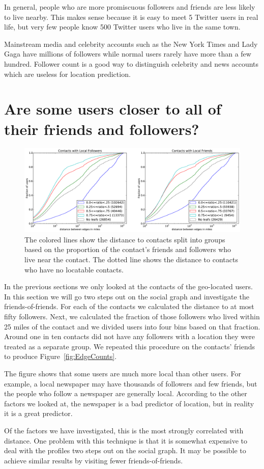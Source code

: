 In general, people who are more promiscuous followers and friends are less
likely to live nearby. This makes sense because it is easy to meet 5 Twitter
users in real life, but very few people know 500 Twitter users who live in the
same town.

Mainstream media and celebrity accounts such as the New York Times and Lady
Gaga have millions of followers while normal users rarely have more than a few
hundred.
Follower count is a good way to distinguish celebrity and news accounts which
are useless for location prediction.

\section{Are some users closer to all of their friends and followers?}

\begin{figure}[tb]
\centering
\includegraphics[width=\linewidth]{figures/local_ratio.pdf}
\caption{
The colored lines show the distance to contacts split into groups based on the
proportion of the contact's friends and followers who live near the contact.
The dotted line shows the distance to contacts who have no locatable contacts.
}
\label{fig:LocalRatio}
\end{figure}

In the previous sections we only looked at the contacts of the geo-located
users. In this section we will go two steps out on the social graph and
investigate the friends-of-friends.
%
For each of the contacts we calculated the distance to at most fifty followers.
%
Next, we calculated the fraction of those followers who lived within 25 miles
of the contact and we divided users into four bins based on that fraction.
%
Around one in ten contacts did not have any followers with a location they were
treated as a separate group.
%
We repeated this procedure on the contacts' friends to produce
Figure~\ref{fig:EdgeCounts}.

The figure shows that some users are much more local than other users.
For example, a local newspaper may have thousands of followers and few friends,
but the people who follow a newspaper are generally local.
According to the other factors we looked at, the newspaper is a bad predictor
of location, but in reality it is a great predictor.

Of the factors we have investigated, this is the most strongly correlated with
distance.
One problem with this technique is that it is somewhat expensive to deal with
the profiles two steps out on the social graph.
It may be possible to achieve similar results by visiting fewer
friends-of-friends.
